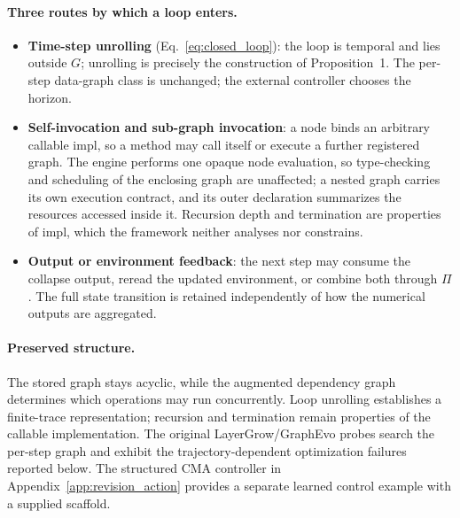 \paragraph{Three routes by which a loop enters.}
\begin{itemize}
    \item \textbf{Time-step unrolling} (Eq.~\ref{eq:closed_loop}): the loop is temporal and lies outside $G$; unrolling is precisely the construction of Proposition~1. The per-step data-graph class is unchanged; the external controller chooses the horizon.
    \item \textbf{Self-invocation and sub-graph invocation}: a node binds an arbitrary callable $\mathrm{impl}$, so a method may call itself or execute a further registered graph. The engine performs one opaque node evaluation, so type-checking and scheduling of the enclosing graph are unaffected; a nested graph carries its own execution contract, and its outer declaration summarizes the resources accessed inside it. Recursion depth and termination are properties of $\mathrm{impl}$, which the framework neither analyses nor constrains.
    \item \textbf{Output or environment feedback}: the next step may consume the collapse output, reread the updated environment, or combine both through $\Pi$. The full state transition is retained independently of how the numerical outputs are aggregated.
\end{itemize}

\begin{table}[htbp]
\centering
\caption{Where a loop lives, and what it changes.}
\label{tab:loop-routes}
\end{table}

\paragraph{Preserved structure.}
The stored graph stays acyclic, while the augmented dependency graph determines which operations may run concurrently. Loop unrolling establishes a finite-trace representation; recursion and termination remain properties of the callable implementation. The original LayerGrow/GraphEvo probes search the per-step graph and exhibit the trajectory-dependent optimization failures reported below. The structured CMA controller in Appendix~\ref{app:revision_action} provides a separate learned control example with a supplied scaffold.

